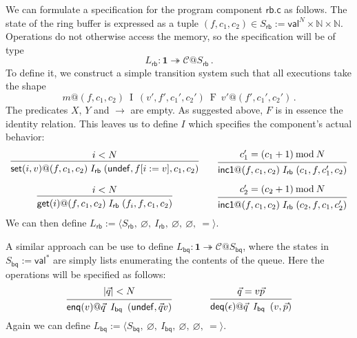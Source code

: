 \documentclass[acmsmall,screen,review,anonymous]{acmart}
\newcommand{\kw}[1]{\ensuremath{ \mathsf{#1} }}
\begin{document}
\begin{example} \label{ex:rbspec} %
We can formulate a specification for
the program component $\kw{rb.c}$ as follows.
The state of the ring buffer
is expressed as a tuple
$(f, c_1, c_2) \in S_\kw{rb} := \kw{val}^N \times \mathbb{N} \times \mathbb{N}$.
Operations do not otherwise access the memory,
so the specification will be of type
\[
  L_\kw{rb} : \mathbf{1} \twoheadrightarrow \mathcal{C}@S_\kw{rb}
  \,.
\]
To define it, we construct a simple transition system such that
all executions take the shape
\[
  m@(f, c_1, c_2) \:\mathrel{I}\: (v', f', c_1', c_2')
                  \:\mathrel{F}\: v'@(f', c_1', c_2')
  \,.
\]
The predicates $X$, $Y$ and $\rightarrow$ are empty.
As suggested above, $F$ is in essence the identity relation.
This leaves us to define $I$ which specifies the component's
actual behavior:
\[ \begin{array}{c@{\qquad}c}
 {\begin{prooftree}
    \hypo{i < N}
    \infer1{
      \kw{set}(i, v)@(f, c_1, c_2)
      \mathrel{I_\kw{rb}}
      (\kw{undef}, f[i := v], c_1, c_2)}
  \end{prooftree}}
  &
 {\begin{prooftree}
    \hypo{c_1' = (c_1 + 1) \mathbin{\mathrm{mod}} N}
    \infer1{
      \kw{inc1}@(f, c_1, c_2)
      \mathrel{I_\kw{rb}}
      (c_1, f, c_1', c_2)}
  \end{prooftree}}
  \vspace{1em}
  \\
 {\begin{prooftree}
    \hypo{i < N}
    \infer1{
      \kw{get}(i)@(f, c_1, c_2)
      \mathrel{I_\kw{rb}}
      (f_i, f, c_1, c_2)
    }
  \end{prooftree}}
  &
 {\begin{prooftree}
    \hypo{c_2' = (c_2 + 1) \mathbin{\mathrm{mod}} N}
    \infer1{
      \kw{inc1}@(f, c_1, c_2)
      \mathrel{I_\kw{rb}}
      (c_2, f, c_1, c_2')}
  \end{prooftree}}
\end{array} \]
We can then define
$L_\kw{rb} := \langle
  S_\kw{rb},\:
  \varnothing,\:
  I_\kw{rb},\:
  \varnothing,\:
  \varnothing,\:
  {=}
 \rangle$.

A similar approach can be use to define
$L_\kw{bq} : \mathbf{1} \twoheadrightarrow \mathcal{C}@S_\kw{bq}$,
where the states in $S_\kw{bq} := \kw{val}^*$
are simply lists enumerating the contents of the queue.
Here the operations will be specified as follows:
\[
  \begin{prooftree}
    \hypo{|\vec{q}| < N}
    \infer1{\kw{enq}(v)@\vec{q} \:\mathrel{I_\kw{bq}}\: (\kw{undef}, \vec{q}v)}
  \end{prooftree}
  \qquad\qquad
  \begin{prooftree}
    \hypo{\vec{q} = v\vec{p}}
    \infer1{\kw{deq}(\epsilon)@\vec{q} \:\mathrel{I_\kw{bq}}\: (v, \vec{p})}
  \end{prooftree}
\]
Again we can define $L_\kw{bq} := \langle
  S_\kw{bq},\:
  \varnothing,\:
  I_\kw{bq},\:
  \varnothing,\:
  \varnothing,\:
  {=}
\rangle$.
\end{example}
\end{document}
